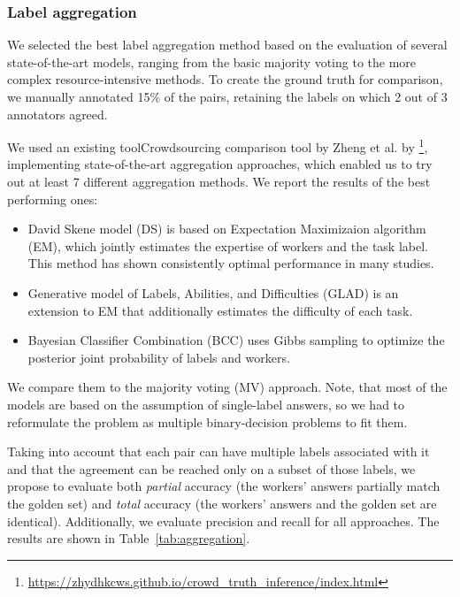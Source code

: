 \subsubsection{Label aggregation}
\label{label_aggregation}
We selected the best label aggregation method based on the evaluation of several state-of-the-art models, ranging from the basic majority voting to the more complex resource-intensive methods.
To create the ground truth for comparison, 
we manually annotated 15\% of the pairs, retaining the labels on which 2 out of 3 annotators agreed.

We used an existing tool\gls{Crowdsourcing comparison tool by Zheng et al.} by \citet{zheng2017truth}\footnote{\href{https://zhydhkcws.github.io/crowd\_truth\_inference/index.html}{https://zhydhkcws.github.io/crowd\_truth\_inference/index.html}}, implementing state-of-the-art aggregation approaches, which enabled us to try out at least 7 different aggregation methods. We report the results of the best performing ones: 
\begin{itemize}
    \item David Skene model (DS) \cite{dawid1979maximum} is based on Expectation Maximizaion algorithm (EM), which jointly estimates the expertise of workers and the task label. This method has shown consistently optimal performance in many studies.
    \item Generative model of Labels, Abilities, and Difficulties (GLAD) \cite{whitehill2009whose} is an extension to EM that additionally estimates the difficulty of each task.
    \item Bayesian Classifier Combination (BCC) \cite{kim2012bayesian} uses Gibbs sampling to optimize the posterior joint probability of labels and workers.
\end{itemize}
We compare them to the majority voting (MV) approach. Note, that most of the models are based on the assumption of single-label answers, so we had to reformulate the problem as multiple binary-decision problems to fit them.

Taking into account that each pair can have multiple labels associated with it and that the agreement can be reached only on a subset of those labels, we propose to evaluate both \emph{partial} accuracy (the workers' answers partially match the golden set) and \emph{total} accuracy (the workers' answers and the golden set are identical). Additionally, we evaluate precision and recall for all approaches. The results are shown in Table~\ref{tab:aggregation}. 

